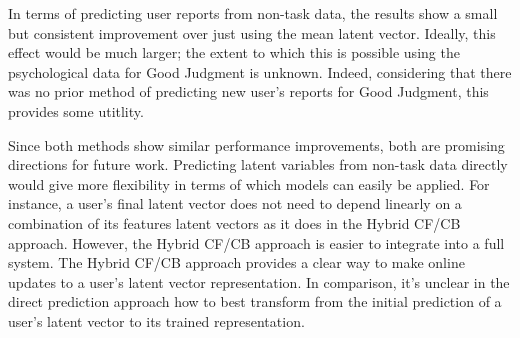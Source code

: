 \documentclass{article}
\begin{document}
In terms of predicting user reports from non-task data, the results show a small but consistent improvement over just using the mean latent vector. Ideally, this effect would be much larger; the extent to which this is possible using the psychological data for Good Judgment is unknown. Indeed, considering that there was no prior method of predicting new user's reports for Good Judgment, this provides some utitlity.

Since both methods show similar performance improvements, both are promising directions for future work. Predicting latent variables from non-task data directly would give more flexibility in terms of which models can easily be applied. For instance, a user's final latent vector does not need to depend linearly on a combination of its features latent vectors as it does in the Hybrid CF/CB approach. However, the Hybrid CF/CB approach is easier to integrate into a full system. The Hybrid CF/CB approach provides a clear way to make online updates to a user's latent vector representation. In comparison, it's unclear in the direct prediction approach how to best transform from the initial prediction of a user's latent vector to its trained representation. 
\end{document}
